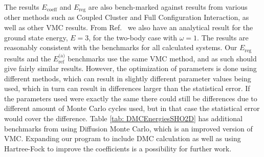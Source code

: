 \documentclass[../main.tex]{subfiles}
\begin{document}
The results $E_\textrm{coeff}$ and $E_\textrm{reg}$ are also bench-marked against results from various other methods such as Coupled Cluster and Full Configuration Interaction, as well as other VMC results. From Ref.~\cite{Taut} we also have an analytical result for the ground state energy, $E=3$, for the two-body case with $\omega=1$. The results are reasonably consistent with the benchmarks for all calculated systems. Our $E_\textrm{reg}$ results and the $E_\textrm{ref}^\textrm{(a)}$ benchmarks use the same VMC method, and as such should give fairly similar results. However, the optimization of parameters is done using different methods, which can result in slightly different parameter values being used, which in turn can result in differences larger than the statistical error. If the parameters used were exactly the same there could still be differences due to different amount of Monte Carlo cycles used, but in that case the statistical error would cover the difference. Table \ref{tab: DMCEnergiesSHO2D} has additional benchmarks from using Diffusion Monte Carlo, which is an improved version of VMC. Expanding our program to include DMC calculation as well as using Hartree-Fock to improve the coefficients is a possibility for further work.
\end{document}
